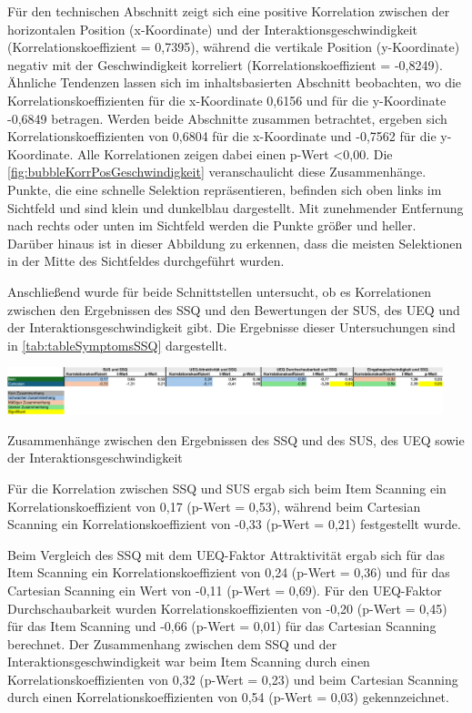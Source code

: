 Für den technischen Abschnitt zeigt sich eine positive Korrelation zwischen der horizontalen Position (x-Koordinate) und der Interaktionsgeschwindigkeit (Korrelationskoeffizient = 0,7395), während die vertikale Position (y-Koordinate) negativ mit der Geschwindigkeit korreliert (Korrelationskoeffizient = -0,8249). Ähnliche Tendenzen lassen sich im inhaltsbasierten Abschnitt beobachten, wo die Korrelationskoeffizienten für die x-Koordinate 0,6156 und für die y-Koordinate -0,6849 betragen. Werden beide Abschnitte zusammen betrachtet, ergeben sich Korrelationskoeffizienten von 0,6804 für die x-Koordinate und -0,7562 für die y-Koordinate. Alle Korrelationen zeigen dabei einen p-Wert <0,00. Die \autoref{fig:bubbleKorrPosGeschwindigkeit} veranschaulicht diese Zusammenhänge. Punkte, die eine schnelle Selektion repräsentieren, befinden sich oben links im Sichtfeld und sind klein und dunkelblau dargestellt. Mit zunehmender Entfernung nach rechts oder unten im Sichtfeld werden die Punkte größer und heller. Darüber hinaus ist in dieser Abbildung zu erkennen, dass die meisten Selektionen in der Mitte des Sichtfeldes durchgeführt wurden.

Anschließend wurde für beide Schnittstellen untersucht, ob es Korrelationen zwischen den Ergebnissen des SSQ und den Bewertungen der SUS, des UEQ und der Interaktionsgeschwindigkeit gibt. Die Ergebnisse dieser Untersuchungen sind in \autoref{tab:tableSymptomsSSQ} dargestellt.

\begin{table}[tbh]
    \centering
    \includegraphics[width=0.95\textwidth]{images/Results/Korrelationen-SSQ.png}
    \caption{Zusammenhänge zwischen den Ergebnissen des SSQ und des SUS, des UEQ sowie der Interaktionsgeschwindigkeit}
    \label{tab:TableKorrelationenSSQ}
\end{table}

Für die Korrelation zwischen SSQ und SUS ergab sich beim Item Scanning ein Korrelationskoeffizient von 0,17 (p-Wert = 0,53), während beim Cartesian Scanning ein Korrelationskoeffizient von -0,33 (p-Wert = 0,21) festgestellt wurde. 

Beim Vergleich des SSQ mit dem UEQ-Faktor Attraktivität ergab sich für das Item Scanning ein Korrelationskoeffizient von 0,24 (p-Wert = 0,36) und für das Cartesian Scanning ein Wert von -0,11 (p-Wert = 0,69). Für den UEQ-Faktor Durchschaubarkeit wurden Korrelationskoeffizienten von -0,20 (p-Wert = 0,45) für das Item Scanning und -0,66 (p-Wert = 0,01) für das Cartesian Scanning berechnet. Der Zusammenhang zwischen dem SSQ und der Interaktionsgeschwindigkeit war beim Item Scanning durch einen Korrelationskoeffizienten von 0,32 (p-Wert = 0,23) und beim Cartesian Scanning durch einen Korrelationskoeffizienten von 0,54 (p-Wert = 0,03) gekennzeichnet.

